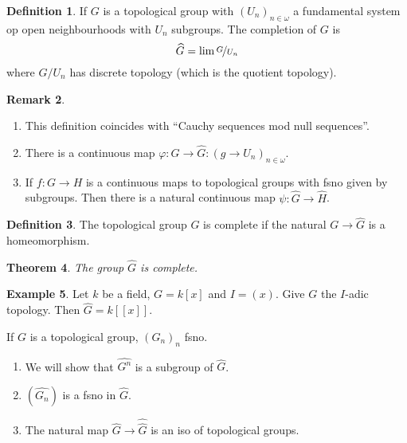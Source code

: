 \documentclass{article}
\newtheorem{theorem}{Theorem}[section]
\theoremstyle{definition}
\newtheorem{definition}[theorem]{Definition}
\newtheorem{remark}[theorem]{Remark}
\newtheorem{example}[theorem]{Example}
\begin{document}
\begin{definition}
    If \(G\) is a topological group with \((U_{n})_{n\in\omega}\) a fundamental
    system op open neighbourhoods with \(U_{n}\) subgroups. The completion of \(G\)
    is
    \[
        \widehat{G}=\lim\nicefrac{G}{U_{n}}
    \]
    where \(G/U_{n}\) has discrete topology (which is the quotient topology).
\end{definition}

\begin{remark}
    \begin{enumerate}
        \item This definition coincides with ``Cauchy sequences mod null
              sequences''.
        \item There is a continuous map \(\varphi:G\to \widehat{G}:(g\to
              U_{n})_{n\in\omega}\).
        \item If \(f:G\to H\) is a continuous maps to topological groups
              with fsno given by subgroups. Then there is a natural continuous map
              \(\psi:\widehat{G}\to\widehat{H}\).
    \end{enumerate}
\end{remark}

\begin{definition}
    The topological group \(G\) is complete if the natural \(G\to \widehat{G}\) is a
    homeomorphism.
\end{definition}

\begin{theorem}
    The group \(\widehat{G}\) is complete.
\end{theorem}

\begin{example}
    Let \(k\) be a field, \(G=k[x]\) and \(I=(x)\). Give \(G\) the \(I\)-adic
    topology. Then \(\widehat{G}=k[[x]]\).
\end{example}

If \(G\) is a topological group, \((G_{n})_{n}\) fsno.

\begin{enumerate}
    \item We will show that \(\widehat{G^{n}}\) is a subgroup of \(\widehat{G}\).
    \item \((\widehat{G_{n}})\) is a fsno in \(\widehat{G}\).
    \item The natural map \(\widehat{G}\to\widehat{\widehat{G}}\) is an iso of topological
          groups.
\end{enumerate}
\end{document}
